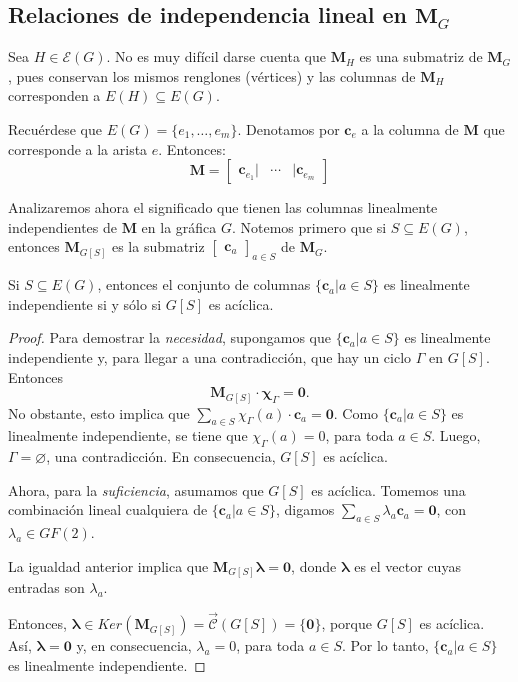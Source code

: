 \subsection{Relaciones de independencia lineal en $\mathbf{M}_{G}$}

Sea $H \in \mathcal{E}(G)$. No es muy difícil darse cuenta que $\mathbf{M}_{H}$ es una submatriz de $\mathbf{M}_{G}$, pues conservan los mismos renglones (vértices) y las columnas de $\mathbf{M}_{H}$ corresponden a $E(H)\subseteq E(G)$.

Recuérdese que $E(G)=\{e_{1}, \ldots, e_{m}\}$. Denotamos por $\mathbf{c}_{e}$ a la columna de $\mathbf{M}$ que corresponde a la arista $e$. Entonces:
$$
\mathbf{M}=\begin{bmatrix}
\mathbf{c}_{e_{1}} |& \cdots & |\mathbf{c}_{e_{m}} 
\end{bmatrix}
$$

Analizaremos ahora el significado que tienen las columnas linealmente independientes de $\mathbf{M}$ en la gráfica $G$. Notemos primero que si $S \subseteq E(G)$, entonces $\mathbf{M}_{G[S]}$ es la submatriz $\begin{bmatrix}
\mathbf{c}_{a}  
\end{bmatrix}_{a \in S}$ de $\mathbf{M}_{G}$.

\begin{teo}\label{teo:liaciclicas} Si $S \subseteq E(G)$, entonces
el conjunto de columnas $\{\mathbf{c}_{a} | a \in S\}$ es linealmente independiente si y sólo si $G[S]$ es acíclica.
\end{teo}

\begin{proof}
Para demostrar la \textit{necesidad}, supongamos que  $\{\mathbf{c}_{a} | a \in S\}$ es linealmente independiente y, para llegar a una contradicción, que hay un ciclo $\Gamma$ en $G[S]$. Entonces $$\mathbf{M}_{G[S]}\cdot\boldsymbol{\chi}_{\Gamma}= \mathbf{0}.$$ No obstante, esto implica que $\sum_{a \in S} \chi_{\Gamma}(a)\cdot\mathbf{c}_{a} = \mathbf{0}$. Como $\{\mathbf{c}_{a} | a \in S\}$ es linealmente independiente, se tiene que $\chi_{\Gamma}(a) = 0$, para toda $a \in S$. Luego, $\Gamma = \varnothing$, una contradicción. En consecuencia, $G[S]$ es acíclica.

Ahora, para la \textit{suficiencia}, asumamos que $G[S]$ es acíclica. Tomemos una combinación lineal cualquiera de $\{\mathbf{c}_{a} | a \in S\}$, digamos $\sum_{a \in S} \lambda_{a} \mathbf{c}_{a} = \mathbf{0}$, con $\lambda_{a} \in GF(2)$.

La igualdad anterior implica que $\mathbf{M}_{G[S]}\boldsymbol{\lambda} = \mathbf{0}$, donde $\boldsymbol{\lambda}$ es el vector cuyas entradas son $\lambda_{a}$.

Entonces, $\boldsymbol{\lambda} \in Ker(\mathbf{M}_{G[S]}) = \overrightarrow{\mathcal{C}}(G[S]) = \{\mathbf{0}\}$, porque $G[S]$ es acíclica. Así, $\boldsymbol{\lambda} = \mathbf{0}$ y, en consecuencia, $\lambda_{a} = 0$, para toda $a \in S$. Por lo tanto, $\{\mathbf{c}_{a} | a \in S\}$ es linealmente independiente.

\end{proof}
 
